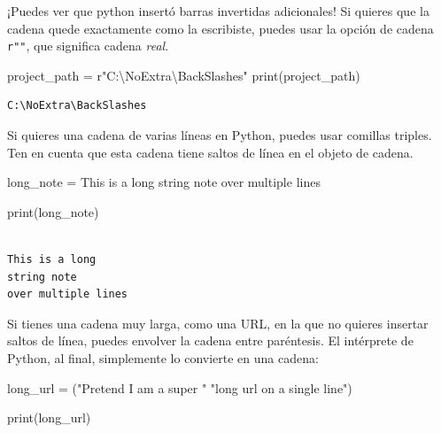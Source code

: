 \documentclass[
  letterpaper,
]{scrbook}
\newenvironment{Shaded}{\begin{snugshade}}{\end{snugshade}}
\newcommand{\BuiltInTok}[1]{\textcolor[rgb]{0.00,0.23,0.31}{#1}}
\newcommand{\NormalTok}[1]{\textcolor[rgb]{0.00,0.23,0.31}{#1}}
\newcommand{\OperatorTok}[1]{\textcolor[rgb]{0.37,0.37,0.37}{#1}}
\newcommand{\StringTok}[1]{\textcolor[rgb]{0.13,0.47,0.30}{#1}}
\newcommand{\VerbatimStringTok}[1]{\textcolor[rgb]{0.13,0.47,0.30}{#1}}
\begin{document}
¡Puedes ver que python insertó barras invertidas adicionales! Si quieres
que la cadena quede exactamente como la escribiste, puedes usar la
opción de cadena \texttt{r""}, que significa cadena \emph{real}.

\begin{Shaded}
\begin{Highlighting}[]
\NormalTok{project\_path }\OperatorTok{=} \VerbatimStringTok{r"C:\textbackslash{}NoExtra\textbackslash{}BackSlashes"}
\BuiltInTok{print}\NormalTok{(project\_path)}
\end{Highlighting}
\end{Shaded}

\begin{verbatim}
C:\NoExtra\BackSlashes
\end{verbatim}

Si quieres una cadena de varias líneas en Python, puedes usar comillas
triples. Ten en cuenta que esta cadena tiene saltos de línea en el
objeto de cadena.

\begin{Shaded}
\begin{Highlighting}[]
\NormalTok{long\_note }\OperatorTok{=} \StringTok{\textquotesingle{}\textquotesingle{}\textquotesingle{}}
\StringTok{This is a long}
\StringTok{string note}
\StringTok{over multiple lines}
\StringTok{\textquotesingle{}\textquotesingle{}\textquotesingle{}}

\BuiltInTok{print}\NormalTok{(long\_note)}
\end{Highlighting}
\end{Shaded}

\begin{verbatim}

This is a long
string note
over multiple lines
\end{verbatim}

Si tienes una cadena muy larga, como una URL, en la que no quieres
insertar saltos de línea, puedes envolver la cadena entre paréntesis. El
intérprete de Python, al final, simplemente lo convierte en una cadena:

\begin{Shaded}
\begin{Highlighting}[]
\NormalTok{long\_url }\OperatorTok{=}\NormalTok{ (}\StringTok{"Pretend I am a super "}
            \StringTok{"long url on a single line"}\NormalTok{)}

\BuiltInTok{print}\NormalTok{(long\_url)}
\end{Highlighting}
\end{Shaded}
\end{document}

